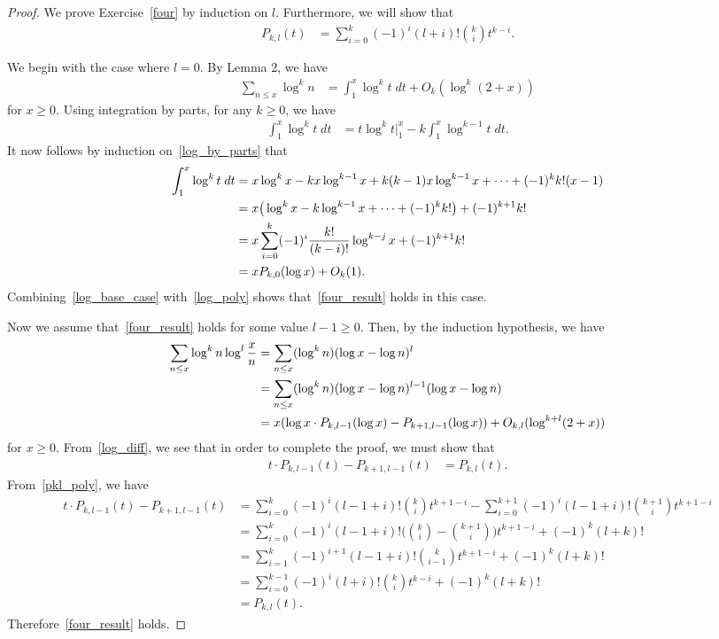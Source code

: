 \documentclass[11pt]{article}
\begin{document}
\begin{proof}
We prove Exercise~\ref{four} by induction on $l$. Furthermore, we will show that
\begin{align}
P_{k,l}(t) &= \sum_{i=0}^k(-1)^i(l+i)!\binom{k}{i}t^{k-i}.\label{pkl_poly}
\end{align}

We begin with the case where $l=0$. By Lemma 2, we have
\begin{align}
\sum_{n\leq x}\log^k{n} &= \int_1^x\log^k{t}\;dt + O_k(\log^k(2+x))\label{log_base_case}
\end{align}
for $x\geq 0$. Using integration by parts, for any $k\geq0$, we have
\begin{align}
\int_1^x\log^k{t}\;dt &= t\log^k{t}\Big\vert_1^x-k\int_1^x\log^{k-1}{t}\;dt.\label{log_by_parts}
\end{align}
It now follows by induction on~\eqref{log_by_parts} that
\begin{align}
\int_1^x\log^k{t}\;dt &= x\log^k{x}-kx\log^{k-1}{x}+k(k-1)x\log^{k-1}{x}+\cdots+(-1)^kk!(x-1)\notag\\
&= x\big(\log^k{x}-k\log^{k-1}{x}+\cdots+(-1)^kk!\big)+(-1)^{k+1}k!\notag\\
&= x\sum_{i=0}^{k}(-1)^i\frac{k!}{(k-i)!}\log^{k-j}{x}+(-1)^{k+1}k!\notag\\
&= xP_{k,0}(\log{x})+O_k(1).\label{log_poly}
\end{align}
Combining~\eqref{log_base_case} with~\eqref{log_poly} shows that~\eqref{four_result} holds in this case.

Now we assume that~\eqref{four_result} holds for some value $l-1\geq 0$. Then, by the induction hypothesis, we have
\begin{align}
\sum_{n\leq x}\log^k{n}\log^l{\frac{x}{n}} &= \sum_{n\leq x}(\log^k{n})(\log{x}-\log{n})^l\notag\\
&= \sum_{n\leq x}(\log^k{n})(\log{x}-\log{n})^{l-1}(\log{x}-\log{n})\notag\\
&= x(\log{x}\cdot P_{k,l-1}(\log{x})-P_{k+1,l-1}(\log{x}))+O_{k,l}(\log^{k+l}(2+x))\label{log_diff}
\end{align}
for $x\geq 0$. From~\eqref{log_diff}, we see that in order to complete the proof, we must show that
\begin{align*}
t\cdot P_{k,l-1}(t)-P_{k+1,l-1}(t) &= P_{k,l}(t).
\end{align*}
From~\eqref{pkl_poly}, we have
\begin{align*}
t\cdot P_{k,l-1}(t)-P_{k+1,l-1}(t) &= \sum_{i=0}^k(-1)^i(l-1+i)!\binom{k}{i}t^{k+1-i}-\sum_{i=0}^{k+1}(-1)^i(l-1+i)!\binom{k+1}{i}t^{k+1-i}\\
&= \sum_{i=0}^k(-1)^i(l-1+i)!\bigg(\binom{k}{i}-\binom{k+1}{i}\bigg)t^{k+1-i}+(-1)^k(l+k)!\\
&= \sum_{i=1}^k(-1)^{i+1}(l-1+i)!\binom{k}{i-1}t^{k+1-i}+(-1)^k(l+k)!\\
&= \sum_{i=0}^{k-1}(-1)^i(l+i)!\binom{k}{i}t^{k-i}+(-1)^k(l+k)!\\
&= P_{k,l}(t).
\end{align*}
Therefore~\eqref{four_result} holds.
\end{proof}
\end{document}
